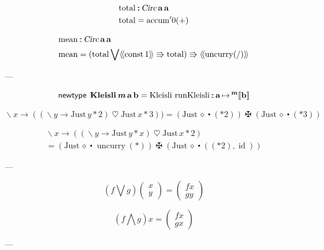 \documentclass[a5paper,twoside,fleqn,draft]{jsbook}
\def\[{[\![}
\def\]{]\!]}
\newcommand{\Langle}{\langle\!\langle}
\newcommand{\Rangle}{\rangle\!\rangle}
\newcommand{\mKeyword}[1]{\mathsf{#1}}
\newcommand{\mNewTypeDeclKeyword}{\mKeyword{newtype}}
\DeclareMathOperator{\mNewTypeDecl}{\mNewTypeDeclKeyword}
\newcommand{\mAnonParam}{\diamond}
\newcommand{\mSpecialFunc}[1]{#1}
\DeclareMathOperator{\mConst}{\mSpecialFunc{const}}
\DeclareMathOperator{\mId}{\mSpecialFunc{id}}
\DeclareMathOperator{\mMean}{\mSpecialFunc{mean}}
\DeclareMathOperator{\mUncurry}{\mSpecialFunc{uncurry}}
\DeclareMathOperator{\mBind}{\heartsuit}
\DeclareMathOperator{\mBindComp}{\maltese}
\DeclareMathOperator{\mComp}{\centerdot}
\DeclareMathOperator{\mIn}{{:\!:}}
\DeclareMathOperator{\mLambda}{\backslash}
\DeclareMathOperator{\mLambdaArrow}{\rightarrow}
\DeclareMathOperator{\mMapsTo}{\mapsto}
\newcommand{\mType}[1]{\mathbf{#1}} %
\newcommand{\mPolymorphicTypeParameter}[1]{\textbf{\textit{#1}}}
\newcommand{\mA}{\mType{a}}
\newcommand{\mB}{\mType{b}}
\newcommand{\mTypeAssemble}[2]{{}^\mType{#1}\[\mType{#2}\]}
\newcommand{\mValueConstructor}[1]{\mathrm{#1}}
\newcommand{\mValueWith}[2]{\mValueConstructor{#1}\,#2}
\newcommand{\mJustWith}[1]{\mValueWith{Just}{#1}}
\newcommand{\mArrowWith}[1]{\Langle#1\Rangle}
\newcommand{\mPairWith}[2]{\begin{pmatrix}#1\\#2\end{pmatrix}}
\begin{document}
\newcommand{\mTotal}{\mathop{\mathrm{total}}}

\begin{align}
  \mTotal&\mIn\mCircuitType\,\mA\,\mA\\
  \mTotal&={\mAccum}'0(+)
\end{align}


\begin{align}
  \mMean&\mIn\mCircuitType\,\mA\,\mA\\
  \mMean&=(\mTotal\mathbin{\bigvee}\mArrowWith{\mConst1}\Rrightarrow\mTotal)\Rrightarrow\mArrowWith{\mUncurry(/)}
\end{align}

---

\newcommand{\mKleisliType}{\mType{Kleisli}}
\newcommand{\mKleisliWith}[1]{\mValueWith{Kleisli}{#1}}
\newcommand{\mRunKleisli}{\mathop{\mathrm{runKleisli}}}

\begin{equation}
  \mNewTypeDecl\;
  \mKleisliType\,\mPolymorphicTypeParameter{m}\,\mA\,\mB
  =\mKleisliWith{\mRunKleisli\mIn\mA\mMapsTo\mTypeAssemble{m}{b}}
\end{equation}

\begin{equation}
  \mLambda x\mLambdaArrow((\mLambda y\mLambdaArrow\mJustWith{y*2})\mBind{}\mJustWith{x*3}))
  =(\mJustWith{\mAnonParam}\mComp(*2))\mBindComp(\mJustWith{\mAnonParam}\mComp(*3))
\end{equation}

\begin{multline}
  \mLambda x\mLambdaArrow((\mLambda y\mLambdaArrow\mJustWith{y*x})\mBind{}\mJustWith{x*2})\\
  =(\mJustWith{\mAnonParam}\mComp\mUncurry(*))\mBindComp(\mJustWith{\mAnonParam}\mComp{}((*2),\mId))
\end{multline}

---

\begin{equation}
  \left(f\bigvee g\right)\mPairWith{x}{y}=\mPairWith{fx}{gy}
\end{equation}

\begin{equation}
  \left(f\bigwedge g\right)x=\mPairWith{fx}{gx}
\end{equation}

---


\end{document}

